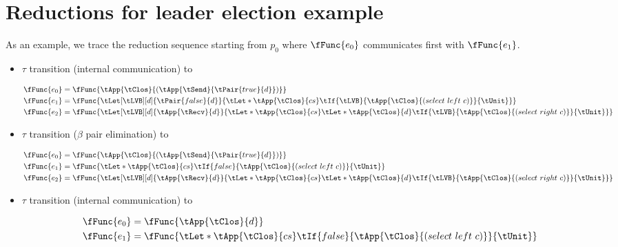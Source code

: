\section{Reductions for leader election example}
\label{sec:reduct-lead-elect}

As an example, we trace the reduction sequence starting from $p_0$  where $\fFunc{e_0}$
communicates first with $\fFunc{e_1}$.
\begin{itemize}
\item $\tau$ transition (internal communication) to
  \begin{small}
    \begin{align*}
      \fFunc{e_0} &=
                    \fFunc{\tApp{\tClos}{(\tApp{\tSend}{\tPair{true}{d}})}}
      \\
      \fFunc{e_1} &=
                    \fFunc{\tLet[\tLVB][d]{\tPair{false}{d}}{\tLet*{\tApp{\tClos}{cs}}{\tIf{\tLVB}{\tApp{\tClos}{(select~left~c)}}{\tUnit}}}}
      \\
      \fFunc{e_2} &=
                    \fFunc{\tLet[\tLVB][d]{\tApp{\tRecv}{d}}{\tLet*{\tApp{\tClos}{cs}}{\tLet*{\tApp{\tClos}{d}}{\tIf{\tLVB}{\tApp{\tClos}{(select~right~c)}}{\tUnit}}}}}
    \end{align*}
  \end{small}
\item $\tau$ transition ($\beta$ pair elimination) to
  \begin{small}
    \begin{align*}
      \fFunc{e_0} &=
                    \fFunc{\tApp{\tClos}{(\tApp{\tSend}{\tPair{true}{d}})}}
      \\
      \fFunc{e_1} &=
                    \fFunc{{\tLet*{\tApp{\tClos}{cs}}{\tIf{false}{\tApp{\tClos}{(select~left~c)}}{\tUnit}}}}
      \\
      \fFunc{e_2} &=
                    \fFunc{\tLet[\tLVB][d]{\tApp{\tRecv}{d}}{\tLet*{\tApp{\tClos}{cs}}{\tLet*{\tApp{\tClos}{d}}{\tIf{\tLVB}{\tApp{\tClos}{(select~right~c)}}{\tUnit}}}}}
    \end{align*}
  \end{small}
\item $\tau$ transition (internal communication) to
  \begin{small}
    \begin{align*}
      \fFunc{e_0} &=
                    \fFunc{\tApp{\tClos}{d}}
      \\
      \fFunc{e_1} &=
                    \fFunc{{\tLet*{\tApp{\tClos}{cs}}{\tIf{false}{\tApp{\tClos}{(select~left~c)}}{\tUnit}}}}

\end{align*}
\end{small}
\end{itemize}
